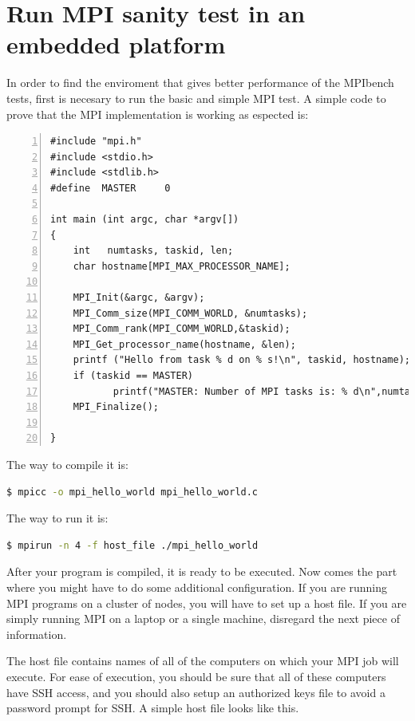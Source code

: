 \section{Run MPI sanity test in an embedded platform}

In order to find the enviroment that gives better performance of the MPIbench
tests, first is necesary to run the basic and simple MPI test. A simple code to
prove that the MPI implementation is working as espected is:

\begin{lstlisting}[frame=single,numbers=left,breaklines=true]
#include "mpi.h"
#include <stdio.h>
#include <stdlib.h>
#define  MASTER     0

int main (int argc, char *argv[])
{
    int   numtasks, taskid, len;
    char hostname[MPI_MAX_PROCESSOR_NAME];

    MPI_Init(&argc, &argv);
    MPI_Comm_size(MPI_COMM_WORLD, &numtasks);
    MPI_Comm_rank(MPI_COMM_WORLD,&taskid);
    MPI_Get_processor_name(hostname, &len);
    printf ("Hello from task % d on % s!\n", taskid, hostname);
    if (taskid == MASTER)
           printf("MASTER: Number of MPI tasks is: % d\n",numtasks);
    MPI_Finalize();

}
\end{lstlisting}

The way to compile it is: 

\begin{lstlisting}[frame=single,language=bash]
  $ mpicc -o mpi_hello_world mpi_hello_world.c
\end{lstlisting}


The way to run it is: 

\begin{lstlisting}[frame=single,language=bash]
  $ mpirun -n 4 -f host_file ./mpi_hello_world
\end{lstlisting}

After your program is compiled, it is ready to be executed. Now comes the part
where you might have to do some additional configuration. If you are running
MPI programs on a cluster of nodes, you will have to set up a host file. If you
are simply running MPI on a laptop or a single machine, disregard the next
piece of information.

The host file contains names of all of the computers on which your MPI job will
execute. For ease of execution, you should be sure that all of these computers
have SSH access, and you should also setup an authorized keys file to avoid a
password prompt for SSH. A simple host file looks like this.

